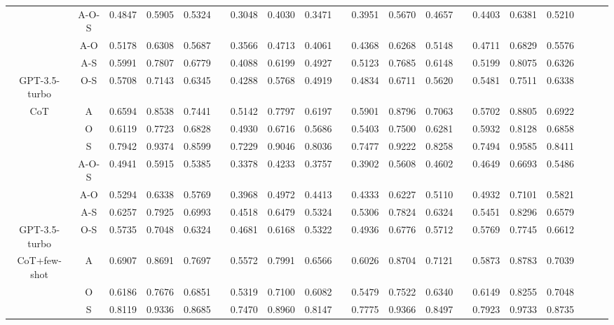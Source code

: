 \documentclass[11pt]{article}
\begin{document}
\begin{table}[ht]
{\begin{tabular}{cccccccccccccccccccc}
    \midrule
          & A-O-S & 0.4847 & 0.5905 & 0.5324 &       & 0.3048 & 0.4030 & 0.3471 &       & 0.3951 & 0.5670 & 0.4657 &       & 0.4403 & 0.6381 & 0.5210 \\
          & A-O   & 0.5178 & 0.6308 & 0.5687 &       & 0.3566 & 0.4713 & 0.4061 &       & 0.4368 & 0.6268 & 0.5148 &       & 0.4711 & 0.6829 & 0.5576 \\
          & A-S   & 0.5991 & 0.7807 & 0.6779 &       & 0.4088 & 0.6199 & 0.4927 &       & 0.5123 & 0.7685 & 0.6148 &       & 0.5199 & 0.8075 & 0.6326 \\
          GPT-3.5-turbo & O-S   & 0.5708 & 0.7143 & 0.6345 &       & 0.4288 & 0.5768 & 0.4919 &       & 0.4834 & 0.6711 & 0.5620 &       & 0.5481 & 0.7511 & 0.6338 \\
          CoT & A     & 0.6594 & 0.8538 & 0.7441 &       & 0.5142 & 0.7797 & 0.6197 &       & 0.5901 & 0.8796 & 0.7063 &       & 0.5702 & 0.8805 & 0.6922 \\
          & O     & 0.6119 & 0.7723 & 0.6828 &       & 0.4930 & 0.6716 & 0.5686 &       & 0.5403 & 0.7500  & 0.6281 &       & 0.5932 & 0.8128 & 0.6858 \\
          & S     & 0.7942 & 0.9374 & 0.8599 &       & 0.7229 & 0.9046 & 0.8036 &       & 0.7477 & 0.9222 & 0.8258 &       & 0.7494 & 0.9585 & 0.8411 \\
    \midrule
          & A-O-S & 0.4941 & 0.5915 & 0.5385 &       & 0.3378 & 0.4233 & 0.3757 &       & 0.3902 & 0.5608 & 0.4602 &       & 0.4649 & 0.6693 & 0.5486 \\
          & A-O   & 0.5294 & 0.6338 & 0.5769 &       & 0.3968 & 0.4972 & 0.4413 &       & 0.4333 & 0.6227 & 0.5110 &       & 0.4932 & 0.7101 & 0.5821 \\
          & A-S   & 0.6257 & 0.7925 & 0.6993 &       & 0.4518 & 0.6479 & 0.5324 &       & 0.5306 & 0.7824 & 0.6324 &       & 0.5451 & 0.8296 & 0.6579 \\
          GPT-3.5-turbo & O-S   & 0.5735 & 0.7048 & 0.6324 &       & 0.4681 & 0.6168 & 0.5322 &       & 0.4936 & 0.6776 & 0.5712 &       & 0.5769 & 0.7745 & 0.6612 \\
          CoT+few-shot& A     & 0.6907 & 0.8691 & 0.7697 &       & 0.5572 & 0.7991 & 0.6566 &       & 0.6026 & 0.8704 & 0.7121 &       & 0.5873 & 0.8783 & 0.7039 \\
          & O     & 0.6186 & 0.7676 & 0.6851 &       & 0.5319 & 0.7100  & 0.6082 &       & 0.5479 & 0.7522 & 0.6340 &       & 0.6149 & 0.8255 & 0.7048 \\
          & S     & 0.8119 & 0.9336 & 0.8685 &       & 0.7470 & 0.8960 & 0.8147 &       & 0.7775 & 0.9366 & 0.8497 &       & 0.7923 & 0.9733 & 0.8735 \\

\end{tabular}}
\end{table}
\end{document}
